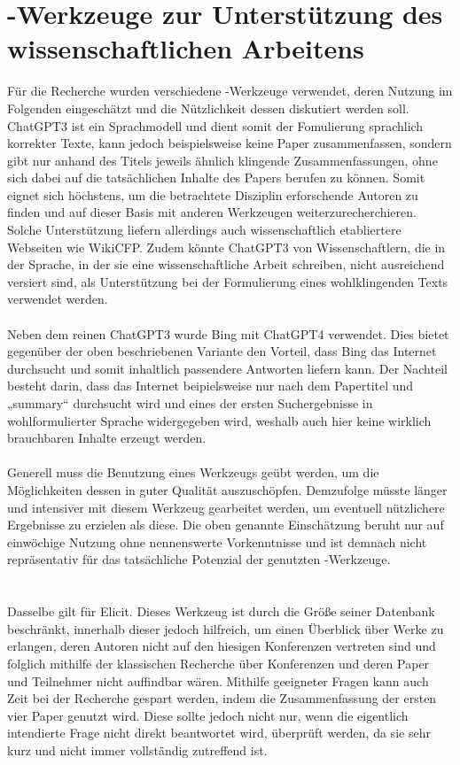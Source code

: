 \documentclass[hidelinks,12pt]{report}
\begin{document}
\newpage

\chapter{-Werkzeuge zur Unterstützung des wissenschaftlichen Arbeitens}
Für die Recherche wurden verschiedene -Werkzeuge verwendet, deren Nutzung im Folgenden eingeschätzt und die Nützlichkeit dessen diskutiert werden soll. 
ChatGPT3 ist ein Sprachmodell und dient somit der Fomulierung sprachlich korrekter Texte, kann jedoch beispielsweise keine Paper zusammenfassen, sondern gibt nur anhand des Titels jeweils ähnlich klingende Zusammenfassungen, ohne sich dabei auf die tatsächlichen Inhalte des Papers berufen zu können. Somit eignet sich höchstens, um die betrachtete Disziplin erforschende Autoren zu finden und auf dieser Basis mit anderen Werkzeugen weiterzurecherchieren. Solche Unterstützung liefern allerdings auch wissenschaftlich etabliertere Webseiten wie WikiCFP. Zudem könnte ChatGPT3 von Wissenschaftlern, die in der Sprache, in der sie eine wissenschaftliche Arbeit schreiben, nicht ausreichend versiert sind, als Unterstützung bei der Formulierung eines wohlklingenden Texts verwendet werden.
\\\\
Neben dem reinen ChatGPT3 wurde Bing mit ChatGPT4 verwendet. Dies bietet gegenüber der oben beschriebenen Variante den Vorteil, dass Bing das Internet durchsucht und somit inhaltlich passendere Antworten liefern kann. Der Nachteil besteht darin, dass das Internet beipielsweise nur nach dem Papertitel und „summary“ durchsucht wird und eines der ersten Suchergebnisse in wohlformulierter Sprache widergegeben wird, weshalb auch hier keine wirklich brauchbaren Inhalte erzeugt werden.
\\\\
Generell muss die Benutzung eines Werkzeugs geübt werden, um die Möglichkeiten dessen in guter Qualität auszuschöpfen. Demzufolge  müsste länger und intensiver mit diesem Werkzeug gearbeitet werden, um eventuell nützlichere Ergebnisse zu erzielen als diese. Die oben genannte Einschätzung beruht nur auf einwöchige Nutzung ohne nennenswerte Vorkenntnisse und ist demnach nicht repräsentativ für das tatsächliche Potenzial der genutzten -Werkzeuge.\\
\\\\
Dasselbe gilt für Elicit. Dieses Werkzeug ist durch die Größe seiner Datenbank beschränkt, innerhalb dieser jedoch hilfreich, um einen Überblick über Werke zu erlangen, deren Autoren nicht auf den hiesigen Konferenzen vertreten sind und folglich mithilfe der klassischen Recherche über Konferenzen und deren Paper und Teilnehmer nicht auffindbar wären. Mithilfe geeigneter Fragen kann auch Zeit bei der Recherche gespart werden, indem die Zusammenfassung der ersten vier Paper genutzt wird. Diese sollte jedoch nicht nur, wenn die eigentlich intendierte Frage nicht direkt beantwortet wird, überprüft werden, da sie sehr kurz und nicht immer vollständig zutreffend ist.

\endgroup



\end{document}
